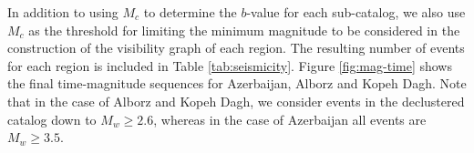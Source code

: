In addition to using $M_c$ to determine the $b$-value for each sub-catalog, we also use $M_c$ as the threshold for limiting the minimum magnitude to be considered in the construction of the visibility graph of each region. The resulting number of events for each region is included in Table \ref{tab:seismicity}. Figure \ref{fig:mag-time} shows the final time-magnitude sequences for Azerbaijan, Alborz and Kopeh Dagh. Note that in the case of Alborz and Kopeh Dagh, we consider events in the declustered catalog down to $M_w \geq 2.6$, whereas in the case of Azerbaijan all events are $M_w \geq 3.5$.

